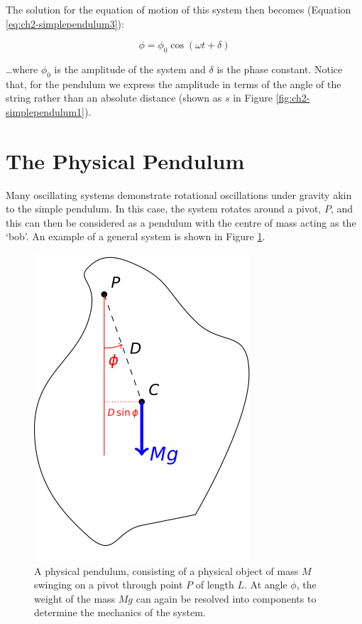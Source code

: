 \documentclass[
]{book}
\begin{document}
The solution for the equation of motion of this system then becomes (Equation \eqref{eq:ch2-simplependulum3}):

\begin{equation}
\phi = \phi_0 \cos (\omega t + \delta)
\label{eq:ch2-simplependulum3}
\end{equation}

\ldots where \(\phi_0\) is the amplitude of the system and \(\delta\) is the phase constant. Notice that, for the pendulum we express the amplitude in terms of the angle of the string rather than an absolute distance (shown as \(s\) in Figure \ref{fig:ch2-simplependulum1}).

\hypertarget{sec:ch2-physicalpendulum}{%
\section{The Physical Pendulum}\label{sec:ch2-physicalpendulum}}

Many oscillating systems demonstrate rotational oscillations under gravity akin to the simple pendulum. In this case, the system rotates around a pivot, \(P\), and this can then be considered as a pendulum with the centre of mass acting as the `bob'. An example of a general system is shown in Figure \ref{fig:ch2-physicalpendulum1}.

\begin{figure}

{\centering \includegraphics[width=0.4\linewidth]{visualisations/LaTeX/ch2-physicalpendulum1} 

}

\caption{A physical pendulum, consisting of a physical object of mass $M$ swinging on a pivot through point $P$ of length $L$. At angle $\phi$, the weight of the mass $Mg$ can again be resolved into components to determine the mechanics of the system.}\label{fig:ch2-physicalpendulum1}
\end{figure}
\end{document}
